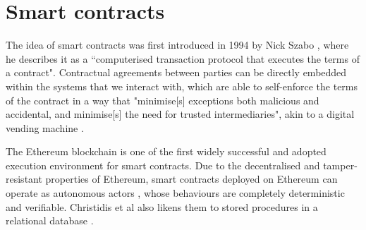 \section{Smart contracts}

The idea of smart contracts was first introduced in 1994 by Nick Szabo \cite{nickszabosmartcontracts1},
where he describes it as a ``computerised transaction protocol that executes the terms of a contract". 
Contractual agreements between parties can be directly embedded within the systems that we 
interact with, which are able to self-enforce the terms of the contract
in a way that "minimise[s] exceptions both malicious and accidental, and minimise[s] the need
for trusted intermediaries", akin to a digital vending machine \cite{nickszabosmartcontracts2}.

The Ethereum blockchain is one of the first widely successful and adopted execution environment for 
smart contracts. Due to the decentralised and tamper-resistant properties of Ethereum, 
smart contracts deployed on Ethereum can operate as autonomous actors \cite{smartcontractsforiot},
whose behaviours are completely deterministic and verifiable. Christidis et al also likens them to 
stored procedures in a relational database \cite{smartcontractsforiot}. 


